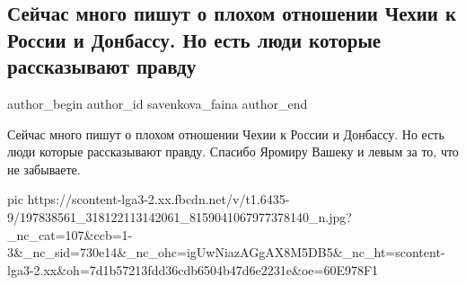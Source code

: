  
 
 
 
 
 
\subsection{Сейчас много пишут о плохом отношении Чехии к России и Донбассу. Но есть люди которые рассказывают правду}
\label{sec:09_06_2021.fb.savenkova_faina.1.chehia_rossia_donbass}
\ifcmt
 author_begin
   author_id savenkova_faina
 author_end
\fi

Сейчас много пишут о плохом отношении Чехии к России и Донбассу. Но есть люди
которые рассказывают правду. Спасибо Яромиру Вашеку и левым за то, что не
забываете.

\ifcmt
  pic https://scontent-lga3-2.xx.fbcdn.net/v/t1.6435-9/197838561_318122113142061_8159041067977378140_n.jpg?_nc_cat=107&ccb=1-3&_nc_sid=730e14&_nc_ohc=igUwNiazAGgAX8M5DB5&_nc_ht=scontent-lga3-2.xx&oh=7d1b57213fdd36cdb6504b47d6e2231e&oe=60E978F1
\fi
